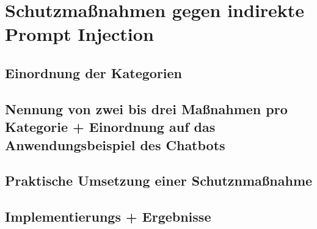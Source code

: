 \chapter{Schutzmaßnahmen gegen indirekte Prompt Injection}\label{ch:schutzmassnahmen}

\section{Einordnung der Kategorien}

\section{Nennung von zwei bis drei Maßnahmen pro Kategorie + Einordnung auf das Anwendungsbeispiel des Chatbots}

\section{Praktische Umsetzung einer Schutznmaßnahme}

\section{Implementierungs + Ergebnisse}



